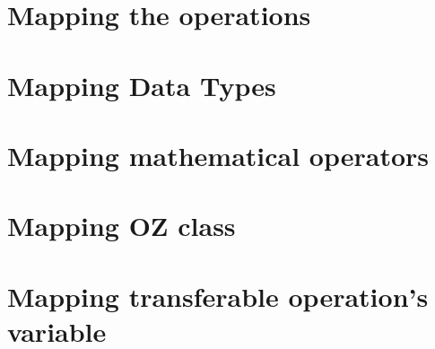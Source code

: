 \section{Mapping the operations}
\label{sec_tra_mapping_operation}


\section{Mapping Data Types}
\label{sec_tra_mapping_data_types}


\section{Mapping mathematical operators}
\label{sec_tra_mapping_mathematical_operations}



\section{Mapping OZ class}
\label{sec_tra_mapping_class}


\section{Mapping transferable operation's variable}
\label{sec_tra_mapping_transferable_operation}


